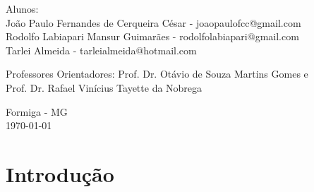 \documentclass[portugues, brazil, a4paper,12pt]{article}
\begin{document}
\begin{titlepage}
  \vfill

  \begin{center}
    \begin{large}
      Alunos: \\
        João Paulo Fernandes de Cerqueira César - joaopaulofcc@gmail.com \\
		Rodolfo Labiapari Mansur Guimarães - rodolfolabiapari@gmail.com \\
		Tarlei Almeida - tarleialmeida@hotmail.com
    \end{large}
  \end{center}

\vfill

  \begin{center}
    \begin{large}
      Professores Orientadores: Prof. Dr. Otávio de Souza Martins Gomes e \\ Prof. Dr. Rafael Vinícius Tayette da Nobrega
    \end{large}
  \end{center}

\vfill

  \begin{center}
    \begin{large}
      Formiga - MG \\
      \today \\
    \end{large}
  \end{center}

\clearpage
\tableofcontents 
\end{titlepage}


\newpage
\section{Introdução}


\end{document}
